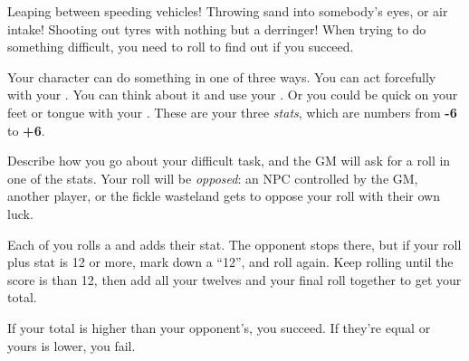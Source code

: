 
Leaping between speeding vehicles! Throwing sand into somebody's eyes, or air intake! Shooting out tyres with nothing but a derringer! When trying to do something difficult, you need to roll to find out if you succeed.

Your character can do something in one of three ways. You can act forcefully with your . You can think about it and use your . Or you could be quick on your feet or tongue with your . These are your three \emph{stats}, which are numbers from \textbf{-6} to \textbf{+6}.

Describe how you go about your difficult task, and the GM will ask for a roll in one of the stats. Your roll will be \emph{opposed}: an NPC controlled by the GM, another player, or the fickle wasteland gets to oppose your roll with their own luck.

Each of you rolls a  and adds their stat. The opponent stops there, but if your roll plus stat is 12 or more, mark down a ``12'', and roll again. Keep rolling until the score is than 12, then add all your twelves and your final roll together to get your total.

If your total is higher than your opponent's, you succeed. If they're equal or yours is lower, you fail.
